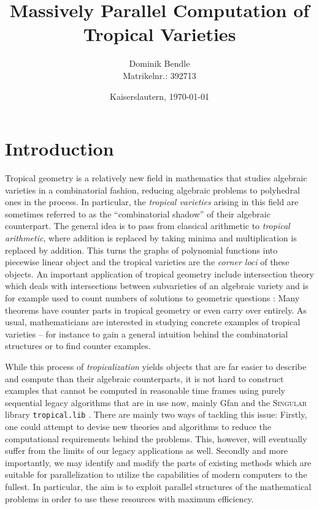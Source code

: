 \documentclass[
  paper=a4,
  titlepage,
  bibliography=totoc,
  pagesize=pdftex
]{scrartcl}
\title{Massively Parallel Computation of Tropical Varieties}
\author{Dominik Bendle\\{\small Matrikelnr.: 392713}}
\date{Kaiserslautern, \today}
\numberwithin{figure}{section}
\numberwithin{equation}{section}
\numberwithin{table}{section}
\theoremstyle{definition}
\numberwithin{definition}{section}
\begin{document}
\pagestyle{plain}

\maketitle

\clearpage\null\clearpage
\tableofcontents
\newpage
\listoffigures
\listoftables
\lstlistoflistings
\newpage

\pagestyle{headings}

\section{Introduction}

Tropical geometry is a relatively new field in mathematics that studies algebraic
varieties in a combinatorial fashion, reducing algebraic problems to polyhedral ones in
the process. In particular, the \emph{tropical varieties} arising in this field are
sometimes referred to as the \enquote{combinatorial shadow} of their algebraic
counterpart. The general idea is to pass from classical arithmetic to \emph{tropical
arithmetic}, where addition is replaced by taking minima and multiplication is replaced by
addition. This turns the graphs of polynomial functions into piecewise linear object and
the tropical varieties are the \emph{corner loci} of these objects. An important
application of tropical geometry include intersection theory which deals with
intersections between subvarieties of an algebraic variety and is for example used to
count numbers of solutions to geometric questions \cite{mikhEnum}: Many theorems have
counter parts in tropical geometry or even carry over entirely. As usual, mathematicians
are interested in studying concrete examples of tropical varieties -- for instance to gain
a general intuition behind the combinatorial structures or to find counter examples.

While this process of \emph{tropicalization} yields objects that are far easier to
describe and compute than their algebraic counterparts, it is not hard to construct
examples that cannot be computed in reasonable time frames using purely sequential legacy
algorithms that are in use now, mainly Gfan \cite{gfan} and the \textsc{Singular} library
\texttt{tropical.lib} \cite{tropLib}. There are mainly two ways of tackling this issue:
Firstly, one could attempt to devise new theories and algorithms to reduce the
computational requirements behind the problems. This, however, will eventually suffer from
the limits of our legacy applications as well. Secondly and more importantly, we may
identify and modify the parts of existing methods which are suitable for parallelization
to utilize the capabilities of modern computers to the fullest. In particular, the aim is
to exploit parallel structures of the mathematical problems in order to use these
resources with maximum efficiency.
\end{document}
